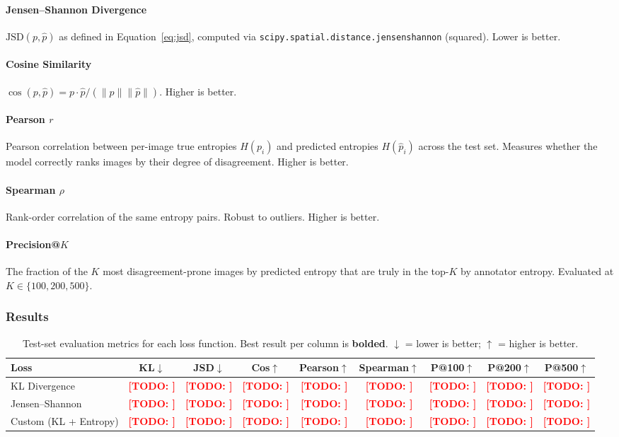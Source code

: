 \documentclass[11pt,a4paper]{article}
\newcommand{\JSD}{\mathrm{JSD}}
\newcommand{\todo}[1]{\textcolor{red}{\textbf{[TODO: #1]}}}
\begin{document}
\paragraph{Jensen--Shannon Divergence} $\JSD(p, \hat{p})$ as defined in
Equation~\eqref{eq:jsd}, computed via \texttt{scipy.spatial.distance.jensenshannon}
(squared). Lower is better.

\paragraph{Cosine Similarity}
$\cos(p, \hat{p}) = p \cdot \hat{p} / (\|p\| \|\hat{p}\|)$.
Higher is better.

\paragraph{Pearson $r$} Pearson correlation between per-image true entropies
$H(p_i)$ and predicted entropies $H(\hat{p}_i)$ across the test set.
Measures whether the model correctly ranks images by their degree of
disagreement. Higher is better.

\paragraph{Spearman $\rho$} Rank-order correlation of the same entropy pairs.
Robust to outliers. Higher is better.

\paragraph{Precision@$K$}
The fraction of the $K$ most disagreement-prone images by predicted entropy
that are truly in the top-$K$ by annotator entropy.
Evaluated at $K \in \{100, 200, 500\}$.

\subsubsection{Results}

\begin{table}[H]
\centering
\caption{%
  Test-set evaluation metrics for each loss function.
  Best result per column is \textbf{bolded}.
  $\downarrow$ = lower is better; $\uparrow$ = higher is better.
}
\label{tab:results}
\setlength{\tabcolsep}{5pt}
\begin{tabular}{lcccccccc}
\toprule
\textbf{Loss} & \textbf{KL}$\downarrow$ & \textbf{JSD}$\downarrow$ &
\textbf{Cos}$\uparrow$ & \textbf{Pearson}$\uparrow$ &
\textbf{Spearman}$\uparrow$ &
\textbf{P@100}$\uparrow$ & \textbf{P@200}$\uparrow$ & \textbf{P@500}$\uparrow$ \\
\midrule
KL Divergence          & \todo{} & \todo{} & \todo{} & \todo{} & \todo{} & \todo{} & \todo{} & \todo{} \\
Jensen--Shannon        & \todo{} & \todo{} & \todo{} & \todo{} & \todo{} & \todo{} & \todo{} & \todo{} \\
Custom (KL + Entropy)  & \todo{} & \todo{} & \todo{} & \todo{} & \todo{} & \todo{} & \todo{} & \todo{} \\
\bottomrule
\end{tabular}
\end{table}
\end{document}
